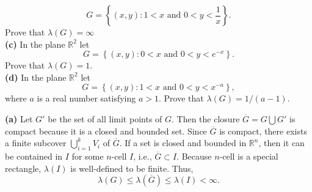\documentclass[answers]{exam}
\begin{document}
\begin{questions}
$$      G = \left\{\left(x,y\right): 1<x \text{ and } 0<y<\frac{1}{x} \right\}.
   $$
   Prove that $\lambda\left(G\right) = \infty$\\
   \textbf{(c)} In the plane $\mathbb{R}^{2}$ let
   $$
      G = \left\{\left(x,y\right): 0<x \text{ and } 0<y<e^{-x} \right\}.
   $$
   Prove that $\lambda\left(G\right)=1$. \\
   \textbf{(d)} In the plane $\mathbb{R}^{2}$ let
   $$
      G = \left\{\left(x,y\right): 1<x \text{ and } 0<y<x^{-a} \right\},
   $$
   where $a$ is a real number satisfying $a>1$. Prove that $\lambda\left(G\right) = 1/\left(a-1\right)$.
   \begin{solution}
      \textbf{(a)} Let $G'$ be the set of all limit points of $G$. Then the closure $\overline{G} = G \bigcup G'$ is compact because it is a closed and bounded set. Since $\overline{G}$ is compact, there exists a finite subcover $\bigcup_{i=1}^{k}V_{i}$ of $\overline{G}$. If a set is closed and bounded in $\mathbb{R}^{n}$, then it can be contained in $I$ for some $n$-cell $I$, i.e., $\overline{G} \subset I$. Because $n$-cell is a special rectangle, $\lambda\left(I\right)$ is well-defined to be finite. Thus,
      $$
         \lambda\left(G\right) \leq \lambda\left(\overline{G}\right) \leq \lambda\left(I\right) < \infty.
      $$
   \end{solution}

   \begin{solution}

   \end{solution}

   \begin{solution}

   \end{solution}

   \begin{solution}


\end{solution}
\end{questions}
\end{document}
